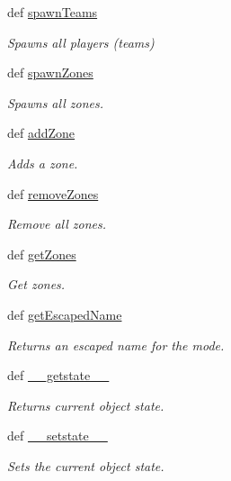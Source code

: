 \begin{DoxyCompactItemize}
def \hyperlink{class_mode_1_1_mode_aa91e4c41bd8f3517b9750ce3c9d1fa92}{spawn\-Teams}
\begin{DoxyCompactList}\small\item\em \-Spawns all players (teams) \end{DoxyCompactList}\item 
def \hyperlink{class_mode_1_1_mode_a447ef57c5a0dee10d4be349c5c6243a2}{spawn\-Zones}
\begin{DoxyCompactList}\small\item\em \-Spawns all zones. \end{DoxyCompactList}\item 
def \hyperlink{class_mode_1_1_mode_a28329c251addb0f853a847755c13a01e}{add\-Zone}
\begin{DoxyCompactList}\small\item\em \-Adds a zone. \end{DoxyCompactList}\item 
def \hyperlink{class_mode_1_1_mode_a8ad1f90875bbf1efd23b79a57051ba6b}{remove\-Zones}
\begin{DoxyCompactList}\small\item\em \-Remove all zones. \end{DoxyCompactList}\item 
def \hyperlink{class_mode_1_1_mode_a6b8bce7dc4a3c84c2680a2628941bec7}{get\-Zones}
\begin{DoxyCompactList}\small\item\em \-Get zones. \end{DoxyCompactList}\item 
def \hyperlink{class_mode_1_1_mode_ad167ac30e80240a1a086f72355ac9e01}{get\-Escaped\-Name}
\begin{DoxyCompactList}\small\item\em \-Returns an escaped name for the mode. \end{DoxyCompactList}\item 
def \hyperlink{class_mode_1_1_mode_a21833f41a4039fec923e93004c65ff4c}{\-\_\-\-\_\-getstate\-\_\-\-\_\-}
\begin{DoxyCompactList}\small\item\em \-Returns current object state. \end{DoxyCompactList}\item 
def \hyperlink{class_mode_1_1_mode_af691ca76e7461e5311ec6bde624739bd}{\-\_\-\-\_\-setstate\-\_\-\-\_\-}
\begin{DoxyCompactList}\small\item\em \-Sets the current object state. \end{DoxyCompactList}\end{DoxyCompactItemize}
